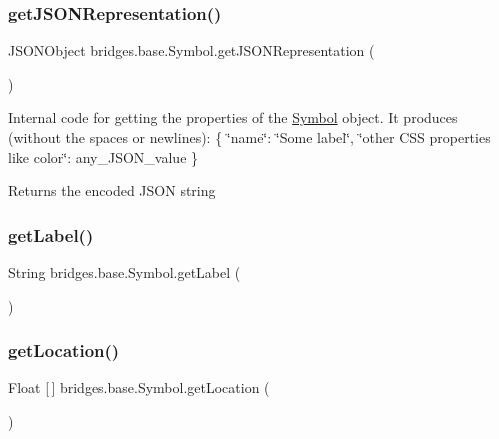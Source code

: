 \subsubsection{\texorpdfstring{get\+J\+S\+O\+N\+Representation()}{getJSONRepresentation()}}
{\footnotesize\ttfamily J\+S\+O\+N\+Object bridges.\+base.\+Symbol.\+get\+J\+S\+O\+N\+Representation (\begin{DoxyParamCaption}{ }\end{DoxyParamCaption})}

Internal code for getting the properties of the \mbox{\hyperlink{classbridges_1_1base_1_1_symbol}{Symbol}} object. It produces (without the spaces or newlines)\+: \{ \char`\"{}name\char`\"{}\+: \char`\"{}\+Some label\char`\"{}, \char`\"{}other C\+S\+S properties like color\char`\"{}\+: any\+\_\+\+J\+S\+O\+N\+\_\+value \} \begin{DoxyReturn}{Returns}
the encoded J\+S\+ON string 
\end{DoxyReturn}
\mbox{\label{classbridges_1_1base_1_1_symbol_a7616c25b288a6e464f4f0b5fe4bd2826}} 
\subsubsection{\texorpdfstring{get\+Label()}{getLabel()}}
{\footnotesize\ttfamily String bridges.\+base.\+Symbol.\+get\+Label (\begin{DoxyParamCaption}{ }\end{DoxyParamCaption})}

\mbox{\label{classbridges_1_1base_1_1_symbol_a73b96ca5cafe7da7b38aa7e7e57fc1d4}} 
\subsubsection{\texorpdfstring{get\+Location()}{getLocation()}}
{\footnotesize\ttfamily Float \mbox{[}$\,$\mbox{]} bridges.\+base.\+Symbol.\+get\+Location (\begin{DoxyParamCaption}{ }\end{DoxyParamCaption})}

